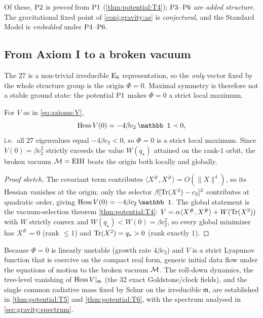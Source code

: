 \begin{remark}\label{rem:axioms:tagging}
Of these, $\textnormal{P2}$ is \emph{proved} from $\textnormal{P1}$ (\autoref{thm:potential:T4});
$\textnormal{P3}$--$\textnormal{P6}$ are \emph{added structure}. The gravitational
fixed point of \autoref{conj:gravity:as} is \emph{conjectural}, and the
Standard Model is \emph{embedded} under $\textnormal{P4}$--$\textnormal{P6}$.
\end{remark}

\subsection{From Axiom I to a broken vacuum}
\label{sec:axioms:broken}

The $27$ is a non-trivial irreducible $\mathrm{E}_{6}$ representation, so the
\emph{only} vector fixed by the whole structure group is the origin
$\Phi=0$. Maximal symmetry is therefore not a stable ground state: the
potential $\textnormal{P1}$ makes $\Phi=0$ a strict local maximum.

\begin{theorem}\label{thm:axioms:origin}
For $V$ as in \eqref{eq:axioms:V},
\[
  \Hess V(0)=-4\beta c_2\,\mathbb 1\prec0,
\]
i.e.\ all $27$ eigenvalues equal $-4\beta c_2<0$, so $\Phi=0$ is a strict
local maximum. Since $V(0)=\beta c_2^2$ strictly exceeds the value
$W(q_\star)$ attained on the rank-$1$ orbit, the broken vacuum
$\mathcal{M}=\mathrm{EIII}$ beats the origin both locally and globally.
\end{theorem}

\begin{proof}[Proof sketch]
The covariant term contributes $\langle X^{\#},X^{\#}\rangle=O(\|X\|^4)$, so
its Hessian vanishes at the origin; only the selector $\beta[\operatorname{Tr}(X^2)-c_2]^2$
contributes at quadratic order, giving $\Hess V(0)=-4\beta c_2\,\mathbb 1$.
The global statement is the vacuum-selection theorem
\autoref{thm:potential:T4}: $V=\alpha\langle X^{\#},X^{\#}\rangle+W(\operatorname{Tr}(X^2))$
with $W$ strictly convex and $W(q_\star)<W(0)=\beta c_2^2$, so every global
minimizer has $X^{\#}=0$ (rank $\le1$) and $\operatorname{Tr}(X^2)=q_\star>0$ (rank
exactly $1$).
\end{proof}

\begin{remark}\label{rem:axioms:rolldown}
Because $\Phi=0$ is linearly unstable (growth rate $4\beta c_2$) and $V$ is a
strict Lyapunov function that is coercive on the compact real form, generic
initial data flow under the equations of motion to the broken vacuum $\mathcal{M}$.
The roll-down dynamics, the tree-level vanishing of $\operatorname{Hess} V|_{\mathfrak m}$
(the $32$ exact Goldstone/clock fields), and the single common radiative mass
fixed by Schur on the irreducible $\mathfrak m$, are established in
\autoref{thm:potential:T5} and \autoref{thm:potential:T6}, with the spectrum
analysed in \autoref{sec:gravity:spectrum}.
\end{remark}

